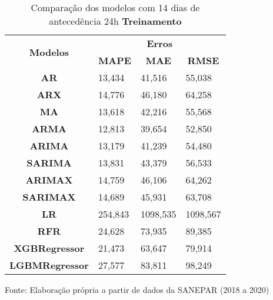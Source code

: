 \begin{table}[H]
	\centering
	\caption{Comparação dos modelos com 14 dias de antecedência 24h \textbf{Treinamento} }\label{tb:30-24trn}
	\begin{tabular}{@{}clll@{}}
		\toprule
		\multirow{2}{*}{\textbf{Modelos}} & \multicolumn{3}{c}{\textbf{Erros}}                                                                       \\ \cmidrule(l){2-4} 
		& \multicolumn{1}{c}{\textbf{MAPE}} & \multicolumn{1}{c}{\textbf{MAE}} & \multicolumn{1}{c}{\textbf{RMSE}} \\ \hline
\textbf{AR}                       & 13,434                            & 41,516                           & 55,038                            \\
\textbf{ARX}                      & 14,776                            & 46,180                           & 64,258                            \\
\textbf{MA}                       & 13,618                            & 42,216                           & 55,568                            \\
\textbf{ARMA}                     & 12,813                            & 39,654                           & 52,850                            \\
\textbf{ARIMA}                    & 13,179                            & 41,239                           & 54,480                            \\
\textbf{SARIMA}                   & 13,831                            & 43,379                           & 56,533                            \\
\textbf{ARIMAX}                   & 14,759                            & 46,106                           & 64,262                            \\
\textbf{SARIMAX}                  & 14,689                            & 45,931                           & 63,708                            \\
\textbf{LR}        & 254,843                           & 1098,535                         & 1098,567                          \\
\textbf{RFR}  & 24,628                            & 73,935                           & 89,385                            \\
\textbf{XGBRegressor}             & 21,473                            & 63,647                           & 79,914                            \\
\textbf{LGBMRegressor}            & 27,577                            & 83,811                           & 98,249                            \\ \bottomrule
	\end{tabular}

Fonte: Elaboração própria a partir de dados da SANEPAR (2018 a 2020)
\end{table}

